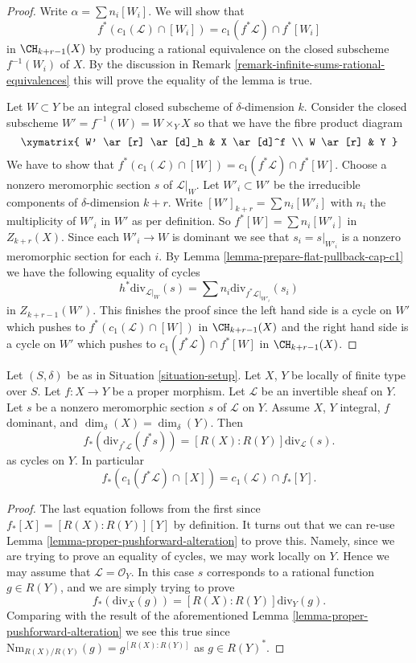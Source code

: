\begin{proof}
Write $\alpha = \sum n_i[W_i]$. We will show that
$$
f^*(c_1(\mathcal{L}) \cap [W_i]) = c_1(f^*\mathcal{L}) \cap f^*[W_i]
$$
in $\CH_{k + r - 1}(X)$ by producing a rational equivalence
on the closed subscheme $f^{-1}(W_i)$ of $X$.
By the discussion in
Remark \ref{remark-infinite-sums-rational-equivalences}
this will prove the equality of the lemma is true.

\medskip\noindent
Let $W \subset Y$ be an integral closed subscheme of $\delta$-dimension $k$.
Consider the closed subscheme $W' = f^{-1}(W) = W \times_Y X$
so that we have the fibre product diagram
$$
\xymatrix{
W' \ar[r] \ar[d]_h & X \ar[d]^f \\
W \ar[r] & Y
}
$$
We have to show that
$f^*(c_1(\mathcal{L}) \cap [W]) = c_1(f^*\mathcal{L}) \cap f^*[W]$.
Choose a nonzero meromorphic section $s$ of $\mathcal{L}|_W$.
Let $W'_i \subset W'$ be the irreducible components of
$\delta$-dimension $k + r$. Write $[W']_{k + r} = \sum n_i[W'_i]$
with $n_i$ the multiplicity of $W'_i$ in $W'$ as per definition.
So $f^*[W] = \sum n_i[W'_i]$ in $Z_{k + r}(X)$.
Since each $W'_i \to W$ is dominant we
see that $s_i = s|_{W'_i}$ is a nonzero meromorphic section for
each $i$. By Lemma \ref{lemma-prepare-flat-pullback-cap-c1}
we have the following equality of cycles
$$
h^*\text{div}_{\mathcal{L}|_W}(s) =
\sum n_i\text{div}_{f^*\mathcal{L}|_{W'_i}}(s_i)
$$
in $Z_{k + r - 1}(W')$. This finishes the proof since
the left hand side is a cycle on $W'$ which pushes to
$f^*(c_1(\mathcal{L}) \cap [W])$ in $\CH_{k + r - 1}(X)$
and the right hand side is a cycle on $W'$ which pushes to
$c_1(f^*\mathcal{L}) \cap f^*[W]$ in $\CH_{k + r - 1}(X)$.
\end{proof}

\begin{lemma}
\label{lemma-equal-c1-as-cycles}
Let $(S, \delta)$ be as in Situation \ref{situation-setup}.
Let $X$, $Y$ be locally of finite type over $S$.
Let $f : X \to Y$ be a proper morphism.
Let $\mathcal{L}$ be an invertible sheaf on $Y$.
Let $s$ be a nonzero meromorphic section $s$ of $\mathcal{L}$ on $Y$.
Assume $X$, $Y$ integral, $f$ dominant, and $\dim_\delta(X) = \dim_\delta(Y)$.
Then
$$
f_*\left(\text{div}_{f^*\mathcal{L}}(f^*s)\right) =
[R(X) : R(Y)]\text{div}_\mathcal{L}(s).
$$
as cycles on $Y$. In particular
$$
f_*(c_1(f^*\mathcal{L}) \cap [X]) = c_1(\mathcal{L}) \cap f_*[Y].
$$
\end{lemma}

\begin{proof}
The last equation follows from the first since $f_*[X] = [R(X) : R(Y)][Y]$
by definition. It turns out that we can re-use
Lemma \ref{lemma-proper-pushforward-alteration}
to prove this. Namely, since we are trying to prove an equality
of cycles, we may work locally on $Y$. Hence we may assume
that $\mathcal{L} = \mathcal{O}_Y$. In this case $s$
corresponds to a rational function $g \in R(Y)$, and
we are simply trying to prove
$$
f_*\left(\text{div}_X(g)\right) =
[R(X) : R(Y)]\text{div}_Y(g).
$$
Comparing with the result of the aforementioned
Lemma \ref{lemma-proper-pushforward-alteration}
we see this true since
$\text{Nm}_{R(X)/R(Y)}(g) = g^{[R(X) : R(Y)]}$
as $g \in R(Y)^*$.
\end{proof}

